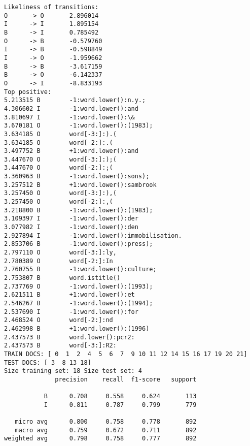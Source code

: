\documentclass[11pt]{article}
\begin{document}
\begin{Verbatim}[commandchars=\\\{\}]
Likeliness of transitions:
O      -> O       2.896014
I      -> I       1.895154
B      -> I       0.785492
O      -> B       -0.579760
I      -> B       -0.598849
I      -> O       -1.959662
B      -> B       -3.617159
B      -> O       -6.142337
O      -> I       -8.833193
Top positive:
5.213515 B        -1:word.lower():n.y.;
4.306602 I        -1:word.lower():and
3.810697 I        -1:word.lower():\&
3.670181 O        -1:word.lower():(1983);
3.634185 O        word[-3:]:).(
3.634185 O        word[-2:]:.(
3.497752 B        +1:word.lower():and
3.447670 O        word[-3:]:);(
3.447670 O        word[-2:]:;(
3.360963 B        -1:word.lower():sons);
3.257512 B        +1:word.lower():sambrook
3.257450 O        word[-3:]:),(
3.257450 O        word[-2:]:,(
3.218800 B        -1:word.lower():(1983);
3.109397 I        -1:word.lower():der
3.077982 I        -1:word.lower():den
2.927894 I        -1:word.lower():immobilisation.
2.853706 B        -1:word.lower():press);
2.797110 O        word[-3:]:ly,
2.780389 O        word[-2:]:In
2.760755 B        -1:word.lower():culture;
2.753807 B        word.istitle()
2.737769 O        -1:word.lower():(1993);
2.621511 B        +1:word.lower():et
2.546267 B        -1:word.lower():(1994);
2.537690 I        -1:word.lower():for
2.468524 O        word[-2:]:nd
2.462998 B        +1:word.lower():(1996)
2.437573 B        word.lower():pcr2:
2.437573 B        word[-3:]:R2:
TRAIN DOCS: [ 0  1  2  4  5  6  7  9 10 11 12 14 15 16 17 19 20 21] TEST DOCS: [ 3  8 13 18]
Size training set: 18 Size test set: 4
              precision    recall  f1-score   support

           B      0.708     0.558     0.624       113
           I      0.811     0.787     0.799       779

   micro avg      0.800     0.758     0.778       892
   macro avg      0.759     0.672     0.711       892
weighted avg      0.798     0.758     0.777       892


\end{Verbatim}
\end{document}
